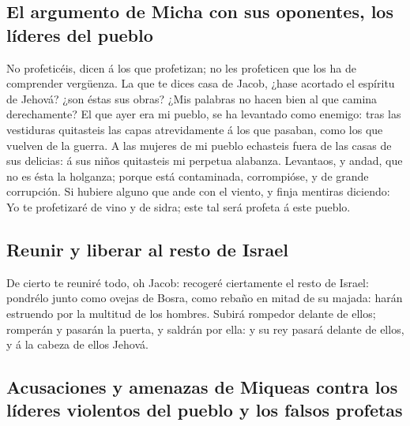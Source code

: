 \hypertarget{el-argumento-de-micha-con-sus-oponentes-los-luxedderes-del-pueblo}{%
\subsection{El argumento de Micha con sus oponentes, los líderes del
pueblo}\label{el-argumento-de-micha-con-sus-oponentes-los-luxedderes-del-pueblo}}

 No profeticéis, dicen á los que profetizan; no les
profeticen que los ha de comprender vergüenza.  La que te
dices casa de Jacob, ¿hase acortado el espíritu de Jehová? ¿son éstas
sus obras? ¿Mis palabras no hacen bien al que camina derechamente?
 El que ayer era mi pueblo, se ha levantado como enemigo:
tras las vestiduras quitasteis las capas atrevidamente á los que
pasaban, como los que vuelven de la guerra.  A las mujeres
de mi pueblo echasteis fuera de las casas de sus delicias: á sus niños
quitasteis mi perpetua alabanza.  Levantaos, y andad, que
no es ésta la holganza; porque está contaminada, corrompióse, y de
grande corrupción.  Si hubiere alguno que ande con el
viento, y finja mentiras diciendo: Yo te profetizaré de vino y de sidra;
este tal será profeta á este pueblo.

\hypertarget{reunir-y-liberar-al-resto-de-israel}{%
\subsection{Reunir y liberar al resto de
Israel}\label{reunir-y-liberar-al-resto-de-israel}}

 De cierto te reuniré todo, oh Jacob: recogeré
ciertamente el resto de Israel: pondrélo junto como ovejas de Bosra,
como rebaño en mitad de su majada: harán estruendo por la multitud de
los hombres.  Subirá rompedor delante de ellos; romperán
y pasarán la puerta, y saldrán por ella: y su rey pasará delante de
ellos, y á la cabeza de ellos Jehová.

\hypertarget{acusaciones-y-amenazas-de-miqueas-contra-los-luxedderes-violentos-del-pueblo-y-los-falsos-profetas}{%
\subsection{Acusaciones y amenazas de Miqueas contra los líderes
violentos del pueblo y los falsos
profetas}\label{acusaciones-y-amenazas-de-miqueas-contra-los-luxedderes-violentos-del-pueblo-y-los-falsos-profetas}}

